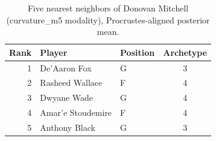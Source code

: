 \begin{table}[htbp]
  \centering\small
  \begin{tabular}{rllc}
    \toprule
    Rank & Player & Position & Archetype \\
    \midrule
    1 & De'Aaron Fox & G & 3 \\
    2 & Rasheed Wallace & F & 4 \\
    3 & Dwyane Wade & G & 4 \\
    4 & Amar'e Stoudemire & F & 4 \\
    5 & Anthony Black & G & 3 \\
    \bottomrule
  \end{tabular}
  \caption{Five nearest neighbors of Donovan Mitchell (curvature_m5 modality), Procrustes-aligned posterior mean.}
  \label{tab:Donovan_Mitchell_neighbors_curvature_m5}
\end{table}


